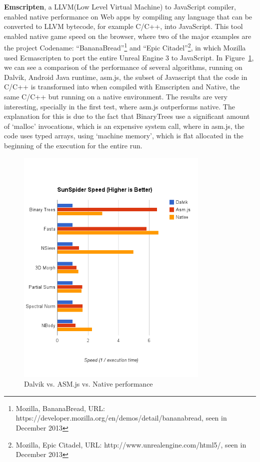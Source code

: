 \textbf{Emscripten}\cite{Zakai2011}, a LLVM(Low Level Virtual Machine) to JavaScript compiler, enabled native performance on Web apps by compiling any language that can be converted to LLVM bytecode, for example C/C++, into JavaScript. This tool enabled native game speed on the browser, where two of the major examples are the project Codename: ``BananaBread''\footnote{Mozilla, BananaBread,  URL: https://developer.mozilla.org/en/demos/detail/bananabread, seen in December 2013} and ``Epic Citadel''\footnote{Mozilla, Epic Citadel,  URL: http://www.unrealengine.com/html5/, seen in December 2013}, in which Mozilla used Ecmascripten to port the entire Unreal Engine 3 to JavaScript. In Figure~\ref{fig:dan}, we can see a comparison of the performance of several algorithms, running on Dalvik, Android Java runtime, asm.js, the subset of Javascript that the code in C/C++ is transformed into when compiled with Emscripten and Native, the same C/C++ but running on a native environment. The results are very interesting, specially in the first test, where asm.js outperforms native. The explanation for this is due to the fact that BinaryTrees use a significant amount of `malloc' invocations, which is an expensive system call, where in asm.js, the code uses typed arrays, using `machine memory', which is flat allocated in the beginning of the execution for the entire run.

\begin{figure}[h!]
  \centering
  \includegraphics[width=0.82\textwidth]{img/Dalvik-vs-ASM-vs-Native-edited}
  \caption{Dalvik vs. ASM.js vs. Native performance}
  \label{fig:dan}
\end{figure}

